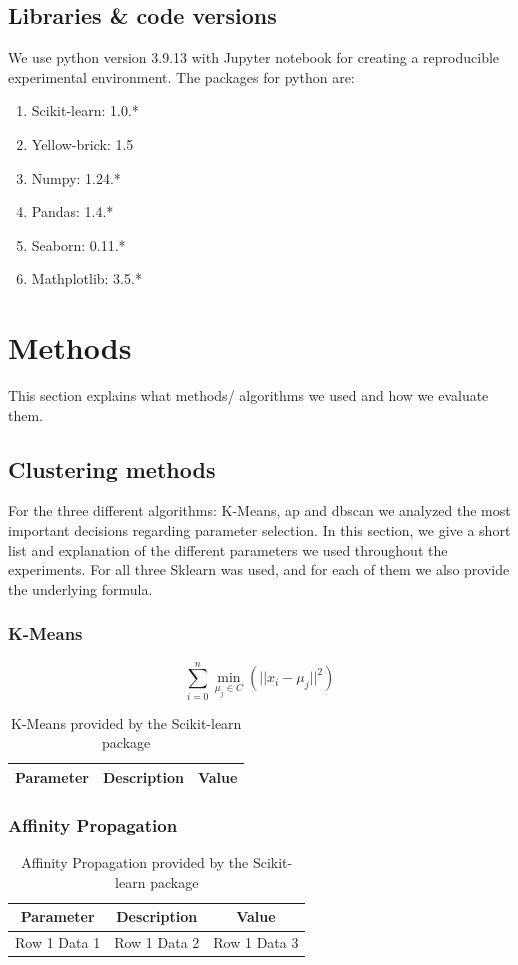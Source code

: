 \subsection{Libraries \& code versions}
We use python version 3.9.13 with Jupyter notebook for creating a reproducible experimental environment.
The packages for python are:
\begin{enumerate}
  \item Scikit-learn: 1.0.*
  \item Yellow-brick: 1.5
  \item Numpy: 1.24.*
  \item Pandas: 1.4.*
  \item Seaborn: 0.11.*
  \item Mathplotlib: 3.5.*
\end{enumerate}

\section{Methods}
This section explains what methods/ algorithms we used and how we evaluate them.
\subsection{Clustering methods}
For the three different algorithms: K-Means, \gls{ap} and \gls{dbscan} we analyzed the most important decisions regarding parameter selection.
In this section, we give a short list and explanation of the different parameters we used throughout the experiments.
For all three Sklearn was used, and for each of them we also provide the underlying formula.
\subsubsection{K-Means}
\begin{equation}
  \sum_{i=0}^{n}\min_{\mu_j \in C}(||x_i - \mu_j||^2)
\end{equation}
\begin{table}[h]
  \begin{tabular}{|c|c|c|}
    \hline
    Parameter & Description & Value \\
    \hline
  \end{tabular}
  \caption{K-Means provided by the Scikit-learn package}
  \label{tab:kmeans-formula-sklearn}
\end{table}
\subsubsection{Affinity Propagation}
\begin{table}[h]
  \begin{tabular}{|c|c|c|}
    \hline
    Parameter    & Description  & Value        \\
    \hline
    Row 1 Data 1 & Row 1 Data 2 & Row 1 Data 3 \\
    \hline
  \end{tabular}
  \caption{Affinity Propagation provided by the Scikit-learn package}
  \label{tab:ap-formula-sklearn}
\end{table}
